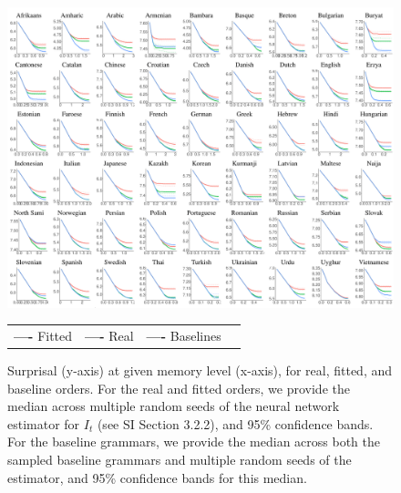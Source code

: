 \begin{figure}
	\begin{center}
\includegraphics[width=\textwidth]{results-table-mle.pdf}
\end{center}

\begin{center}
\begin{tabular}{llll}
\textbf{\textcolor{fitted}{----}} Fitted&
\textbf{\textcolor{real}{----}} Real&
\textbf{\textcolor{baseline}{----}} Baselines&
\end{tabular}
\end{center}
	\caption{Surprisal (y-axis) at given memory level (x-axis), for real, fitted, and baseline orders.
	For the real and fitted orders, we provide the median across multiple random seeds of the neural network estimator for $I_t$ (see SI Section 3.2.2), and 95\% confidence bands.
	For the baseline grammars, we provide the median across both the sampled baseline grammars and multiple random seeds of the estimator, and 95\% confidence bands for this median.
}\label{fig:median-table-expt2}
\end{figure}


